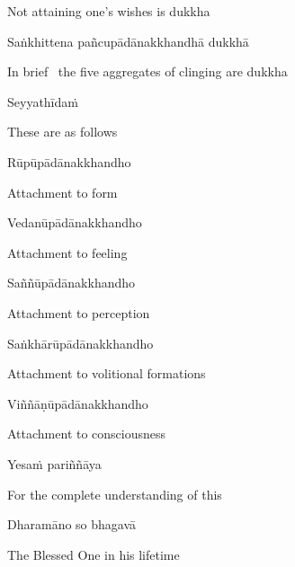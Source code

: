 \begin{cprenglish}
  Not attaining one’s wishes is dukkha
\end{cprenglish}

Saṅkhittena pañcupādānakkhandhā dukkhā

\begin{cprenglish}
  In brief \breathmark\ the five aggregates of clinging are dukkha
\end{cprenglish}

Seyyathīdaṁ

\begin{cprenglish}
  These are as follows
\end{cprenglish}

Rūpūpādānakkhandho

\begin{cprenglish}
  Attachment to form
\end{cprenglish}

Vedanūpādānakkhandho

\begin{cprenglish}
  Attachment to feeling
\end{cprenglish}

Saññūpādānakkhandho

\begin{cprenglish}
  Attachment to perception
\end{cprenglish}

Saṅkhārūpādānakkhandho

\begin{cprenglish}
  Attachment to volitional formations
\end{cprenglish}

Viññāṇūpādānakkhandho

\begin{cprenglish}
  Attachment to consciousness
\end{cprenglish}

Yesaṁ pariññāya

\begin{cprenglish}
  For the complete understanding of this
\end{cprenglish}

Dharamāno so bhagavā

\begin{cprenglish}
  The Blessed One in his lifetime
\end{cprenglish}

